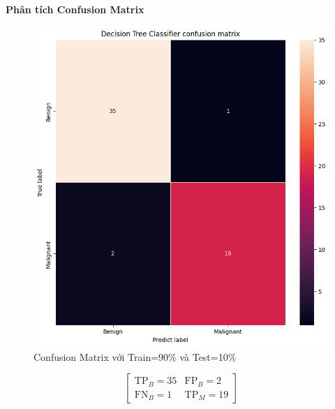\textbf{Phân tích Confusion Matrix}
\begin{figure}[h!]
	\centering
	\begin{minipage}[b]{0.6\linewidth}
		\centering
		\includegraphics[width=\linewidth]{figures/dataset1/9010.png}
		\caption{Confusion Matrix với Train=90\% và Test=10\%}
		\label{fig:confusion_9010}
	\end{minipage}
\end{figure}

\[
\begin{bmatrix}
	\text{TP}_{B} = 35 & \text{FP}_{B} = 2 \\
	\text{FN}_{B} = 1   & \text{TP}_{M} = 19
\end{bmatrix}
\]

